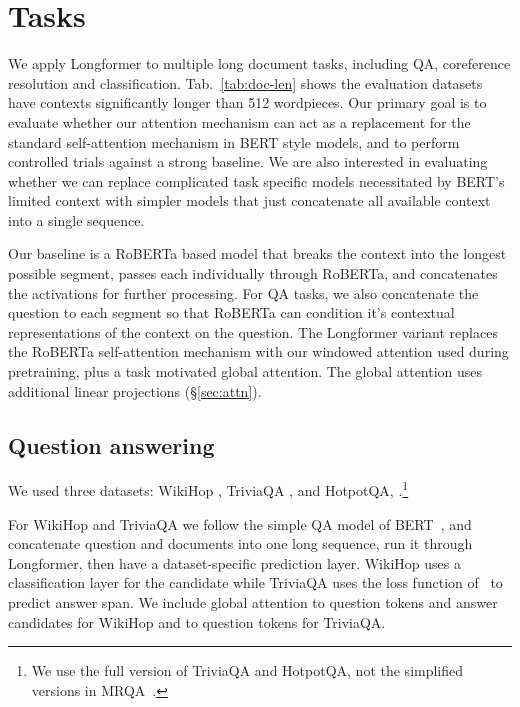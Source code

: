 \documentclass[11pt,a4paper]{article}
\newcommand{\model}{Longformer\xspace}
\begin{document}
\section{Tasks}

We apply \model to multiple long document tasks, including QA, coreference resolution and classification.  Tab.~\ref{tab:doc-len} shows the evaluation datasets have contexts significantly longer than 512 wordpieces.
Our primary goal is to evaluate whether our attention mechanism can act as a replacement for the standard self-attention mechanism in BERT style models, and to perform controlled trials against a strong baseline.
We are also interested in evaluating whether we can replace complicated task specific models necessitated by BERT's limited context with simpler models that just concatenate all available context into a single sequence.

Our baseline is a RoBERTa based model that breaks the context into the longest possible segment, passes each individually through RoBERTa, and concatenates the activations for further processing.
For QA tasks, we also concatenate the question to each segment so that RoBERTa can condition it's contextual representations of the context on the question.
The \model variant replaces the RoBERTa self-attention mechanism with our windowed attention used during pretraining, plus a task motivated global attention.  The global attention uses additional linear projections (\S\ref{sec:attn}).




\subsection{Question answering}
We used three datasets: WikiHop \cite{Welbl2018ConstructingDF-Wikihop}, TriviaQA \cite[][Wikipedia setting]{Joshi2017TriviaQAAL}, and HotpotQA, \cite[][distractor setting]{Yang2018-HotpotQAAD}.\footnote{We use the full version of TriviaQA and HotpotQA, not the simplified versions in MRQA~\cite{mrqa}.} 



For WikiHop and TriviaQA we follow the simple QA model of BERT~\cite{bert}, and concatenate question and documents into one long sequence, run it through \model, then have a dataset-specific prediction layer. WikiHop uses a classification layer for the candidate while TriviaQA uses the loss function of~\citet{Clark2017SimpleAE} to predict answer span.  We include global attention to question tokens and answer candidates for WikiHop and to question tokens for TriviaQA.
\end{document}
